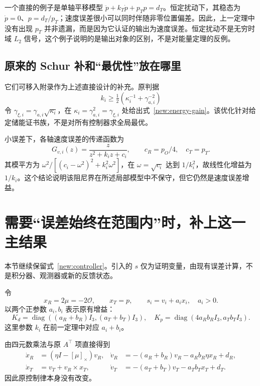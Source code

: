 一个直接的例子是单轴平移模型 $\ddot p+k_T\dot p+p_Tp=d_T$。恒定扰动下，其稳态为 $\dot p=0$、$p=d_T/p_T$；速度误差很小可以同时伴随非零位置偏差。因此，上一定理中没有出现 $p_T$ 并非遗漏，而是因为它认证的输出为速度误差。恒定扰动不是无穷时域 $L_2$ 信号，这个例子说明的是输出对象的区别，不是对能量定理的反例。

\subsection{原来的 Schur 补和“最优性”放在哪里}

它们可移入附录作为上述直接设计的补充。原判据
\[
k_i\ge\tfrac12(\kappa_i^{-1}+\gamma_{a,i}^{-2})
\]
令 $\gamma_{\xi,i}=\gamma_{a,i}\sqrt{\kappa_i}$，在 $\kappa_i=\gamma_{a,i}^2=\gamma_{\xi,i}$ 处给出式~\eqref{new:energy-gain}。该优化针对给定储能证书族，不是对所有控制器求全局最优。

小误差下，各轴速度误差的传递函数为
\[
G_{v,i}(z)=\frac{z}{z^2+k_i z+c_i},
\qquad c_R=p_O/4,\quad c_T=p_T.
\]
其模平方为 $\omega^2/[(c_i-\omega^2)^2+k_i^2\omega^2]$，在 $\omega=\sqrt{c_i}$ 达到 $1/k_i^2$，故线性化增益为 $1/k_i$。这个结论说明该阻尼界在所述局部模型中不保守，但它仍然是速度误差增益。

\section{需要“误差始终在范围内”时，补上这一主结果}\label{sec:peak}

本节继续保留式~\eqref{new:controller}。引入的 $s$ 仅为证明变量，由现有误差计算，不是积分器、观测器或新的反馈状态。

令
\[
x_R=2\mu=-2\mathcal O,\qquad x_T=p,
\qquad s_i=v_i+a_i x_i,\quad a_i>0.
\]
以两个正参数 $a_i,b_i$ 表示原有增益：
\begin{equation}
\boxed{K_d=\operatorname{diag}((a_R+b_R)I_3,(a_T+b_T)I_3),\quad
K_p=\operatorname{diag}(4a_Rb_RI_3,a_Tb_TI_3).}
\label{new:ab}
\end{equation}
这里参数 $k_i$ 在前一定理中对应 $a_i+b_i$。

由四元数乘法与原 $A^\top$ 项直接得到
\begin{align}
\dot x_R&=(\eta I-[\mu]_\times)v_R,
&\dot v_R&=-(a_R+b_R)v_R-a_Rb_R\eta x_R+d_R,
\label{new:rot}\\
\dot x_T&=v_T+v_R\times x_T,
&\dot v_T&=-(a_T+b_T)v_T-a_Tb_Tx_T+d_T.
\label{new:trans}
\end{align}
因此原控制律本身没有改变。

